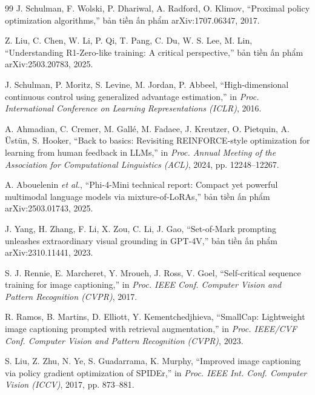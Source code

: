 \begin{thebibliography}{99}
 J. Schulman, F. Wolski, P. Dhariwal, A. Radford, O. Klimov, ``Proximal policy
optimization algorithms,'' bản tiền ấn phẩm arXiv:1707.06347, 2017.

 Z. Liu, C. Chen, W. Li, P. Qi, T. Pang, C. Du, W. S. Lee, M. Lin, ``Understanding R1-Zero-like training: A critical perspective,'' bản tiền ấn phẩm arXiv:2503.20783, 2025.

 J. Schulman, P. Moritz, S. Levine, M. Jordan, P. Abbeel, ``High-dimensional
continuous control using generalized advantage estimation,'' in \emph{Proc. International
Conference on Learning Representations (ICLR)}, 2016.

 A. Ahmadian, C. Cremer, M. Gallé, M. Fadaee, J. Kreutzer, O. Pietquin,
A. Üstün, S. Hooker, ``Back to basics: Revisiting REINFORCE-style optimization for learning from
human feedback in LLMs,'' in \emph{Proc. Annual Meeting of the Association for Computational
Linguistics (ACL)}, 2024, pp. 12248--12267.


 A. Abouelenin \emph{et al.}, ``Phi-4-Mini technical report: Compact yet powerful
multimodal language models via mixture-of-LoRAs,'' bản tiền ấn phẩm arXiv:2503.01743, 2025.

 J. Yang, H. Zhang, F. Li, X. Zou, C. Li, J. Gao, ``Set-of-Mark prompting
unleashes extraordinary visual grounding in GPT-4V,'' bản tiền ấn phẩm arXiv:2310.11441, 2023.

 S. J. Rennie, E. Marcheret, Y. Mroueh, J. Ross, V. Goel, ``Self-critical sequence
training for image captioning,'' in \emph{Proc. IEEE Conf. Computer Vision and Pattern
Recognition (CVPR)}, 2017.

 R. Ramos, B. Martins, D. Elliott, Y. Kementchedjhieva, ``SmallCap: Lightweight
image captioning prompted with retrieval augmentation,'' in \emph{Proc. IEEE/CVF Conf. Computer
Vision and Pattern Recognition (CVPR)}, 2023.

 S. Liu, Z. Zhu, N. Ye, S. Guadarrama, K. Murphy, ``Improved image captioning via
policy gradient optimization of SPIDEr,'' in \emph{Proc. IEEE Int. Conf. Computer Vision
(ICCV)}, 2017, pp. 873--881.

\end{thebibliography}
